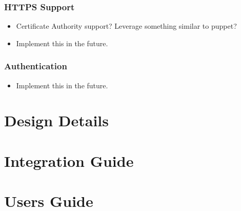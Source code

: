 \documentclass[letterpaper]{article}
\begin{document}
\subsubsection{HTTPS Support}

\begin{itemize}
\item
Certificate Authority support?  Leverage something similar to puppet?

\item
Implement this in the future.
\end{itemize}

\subsubsection{Authentication}

\begin{itemize}
\item
Implement this in the future.
\end{itemize}

\section{Design Details}

\section{Integration Guide}

\section{Users Guide}

\end{document}
